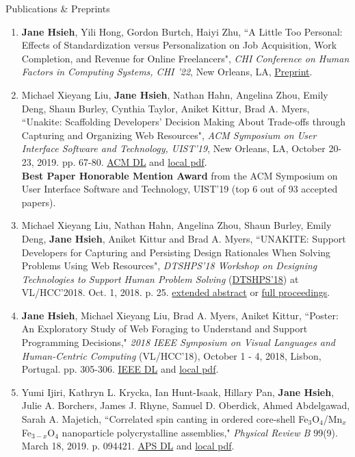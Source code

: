 \documentclass{resume}
\begin{document}
\begin{rSection}{Publications \& Preprints}
\begin{enumerate}
    \item \textbf{Jane Hsieh}, Yili Hong, Gordon Burtch, Haiyi Zhu, ``A Little Too Personal: Effects of Standardization versus Personalization on Job Acquisition, Work Completion, and Revenue for Online Freelancers", \textit{CHI Conference on Human Factors in Computing Systems, CHI ’22}, New Orleans, LA, \href{https://janeon.github.io/resources/chi22.pdf}{Preprint}.
    \item Michael Xieyang Liu, \textbf{Jane Hsieh}, Nathan Hahn, Angelina Zhou, Emily Deng, Shaun Burley, Cynthia Taylor, Aniket Kittur, Brad A. Myers, ``Unakite: Scaffolding Developers’ Decision Making About Trade-offs through Capturing and Organizing Web Resources", \textit{ACM Symposium on User Interface Software and Technology, UIST'19}, New Orleans, LA, October 20-23, 2019. pp. 67-80. \href{https://dl.acm.org/citation.cfm?id=3347908}{ACM DL} and \href{http://www.cs.cmu.edu/~NatProg/papers/p67-liu-Unakite-UIST.pdf}{local pdf}.\\
    \textbf{Best Paper Honorable Mention Award} from the ACM Symposium on User Interface Software and Technology, UIST'19 (top 6 out of 93 accepted papers). 
    \item Michael Xieyang Liu, Nathan Hahn, Angelina Zhou, Shaun Burley, Emily Deng, \textbf{Jane Hsieh}, Aniket Kittur and Brad A. Myers, ``UNAKITE: Support Developers for Capturing and Persisting Design Rationales When Solving Problems Using Web Resources", \textit{DTSHPS'18 Workshop on Designing Technologies to Support Human Problem Solving} (\href{https://www.cs.washington.edu/dtshps2018/index.html}{DTSHPS'18}) at VL/HCC'2018. Oct. 1, 2018. p. 25. \href{\myurl}{extended abstract} or \href{\myurl2}{full proceedings}.
    \item \textbf{Jane Hsieh}, Michael Xieyang Liu, Brad A. Myers, Aniket Kittur, ``Poster: An Exploratory Study of Web Foraging to Understand and Support Programming Decisions," \textit{2018 IEEE Symposium on Visual Languages and Human-Centric Computing} (VL/HCC'18), October 1 - 4, 2018, Lisbon, Portugal. pp. 305-306. \href{https://ieeexplore.ieee.org/document/8506517}{IEEE DL} and \href{http://www.cs.cmu.edu/~NatProg/papers/p305-hsieh.pdf}{local pdf}.
    \item Yumi Ijiri, Kathryn L. Krycka, Ian Hunt-Isaak, Hillary Pan, \textbf{Jane Hsieh}, Julie A. Borchers, James J. Rhyne, Samuel D. Oberdick, Ahmed Abdelgawad, Sarah A. Majetich, ``Correlated spin canting in ordered core-shell Fe$_3$O$_4$/Mn$_x$Fe$_{3-x}$O$_4$ nanoparticle polycrystalline assemblies," \textit{Physical Review B} 99(9). March 18, 2019. p. 094421. \href{https://journals.aps.org/prb/abstract/10.1103/PhysRevB.99.094421}{APS DL} and \href{https://janeon.github.io/assets/img/PhysRevB.99.094421.pdf}{local pdf}.

\end{enumerate}
\end{rSection}
\end{document}
